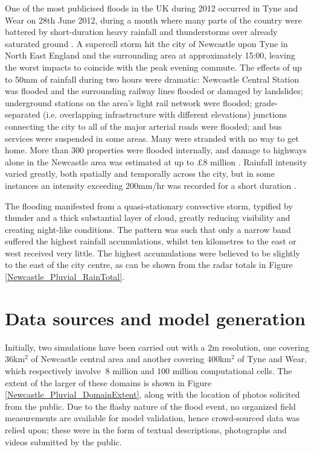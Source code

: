 One of the most publicised floods in the UK during 2012 occurred in Tyne and Wear on 28th June 2012, during a month where many parts of the country were battered by short-duration heavy rainfall and thunderstorms over already saturated ground \citep{JBARiskManagement2012}. A supercell storm hit the city of Newcastle upon Tyne in North East England and the surrounding area at approximately 15:00, leaving the worst impacts to coincide with the peak evening commute. The effects of up to 50mm of rainfall during two hours were dramatic: Newcastle Central Station was flooded and the surrounding railway lines flooded or damaged by landslides; underground stations on the area's light rail network were flooded; grade-separated (i.e. overlapping infrastructure with different elevations) junctions connecting the city to all of the major arterial roads were flooded; and bus services were suspended in some areas. Many were stranded with no way to get home. More than 300 properties were flooded internally, and damage to highways alone in the Newcastle area was estimated at up to £8 million \citep{NewcastleCityCouncil2013}. Rainfall intensity varied greatly, both spatially and temporally across the city, but in some instances an intensity exceeding 200mm/hr was recorded for a short duration \citep{EnvironmentAgency2012a}.

The flooding manifested from a quasi-stationary convective storm, typified by thunder and a thick substantial layer of cloud, greatly reducing visibility and creating night-like conditions. The pattern was such that only a narrow band suffered the highest rainfall accumulations, whilst ten kilometres to the east or west received very little. The highest accumulations were believed to be slightly to the east of the city centre, as can be shown from the radar totals in Figure \ref{Newcastle_Pluvial_RainTotal}.

\section{Data sources and model generation}

Initially, two simulations have been carried out with a 2m resolution, one covering 36km$^{2}$ of Newcastle central area and another covering 400km$^{2}$ of Tyne and Wear, which respectively involve $~8$ million and $100$ million computational cells. The extent of the larger of these domains is shown in Figure \ref{Newcastle_Pluvial_DomainExtent}, along with the location of photos solicited from the public. Due to the flashy nature of the flood event, no organized field measurements are available for model validation, hence crowd-sourced data was relied upon; these were in the form of textual descriptions, photographs and videos submitted by the public.

